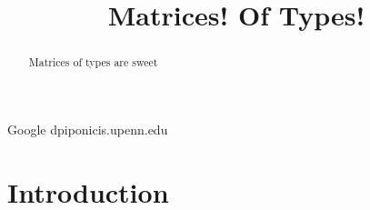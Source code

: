 \documentclass[authoryear,preprint]{sigplanconf}
\begin{document}


\title{Matrices! Of Types!}

           {Google}
           {dpiponicis.upenn.edu}

\maketitle

\begin{abstract}
Matrices of types are sweet
\end{abstract}




\section{Introduction}
\end{document}
